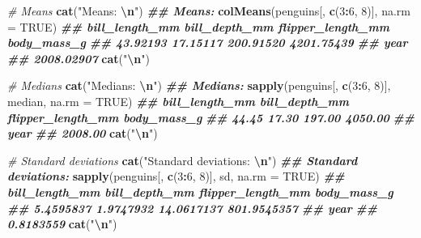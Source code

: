 \documentclass[
]{article}
\newenvironment{Shaded}{\begin{snugshade}}{\end{snugshade}}
\newcommand{\AttributeTok}[1]{\textcolor[rgb]{0.13,0.29,0.53}{#1}}
\newcommand{\CommentTok}[1]{\textcolor[rgb]{0.56,0.35,0.01}{\textit{#1}}}
\newcommand{\ConstantTok}[1]{\textcolor[rgb]{0.56,0.35,0.01}{#1}}
\newcommand{\DecValTok}[1]{\textcolor[rgb]{0.00,0.00,0.81}{#1}}
\newcommand{\DocumentationTok}[1]{\textcolor[rgb]{0.56,0.35,0.01}{\textbf{\textit{#1}}}}
\newcommand{\FunctionTok}[1]{\textcolor[rgb]{0.13,0.29,0.53}{\textbf{#1}}}
\newcommand{\NormalTok}[1]{#1}
\newcommand{\SpecialCharTok}[1]{\textcolor[rgb]{0.81,0.36,0.00}{\textbf{#1}}}
\newcommand{\StringTok}[1]{\textcolor[rgb]{0.31,0.60,0.02}{#1}}
\begin{document}
\begin{Shaded}
\begin{Highlighting}[]
\CommentTok{\# Means}
\FunctionTok{cat}\NormalTok{(}\StringTok{"Means: }\SpecialCharTok{\textbackslash{}n}\StringTok{"}\NormalTok{)}
\DocumentationTok{\#\# Means:}
\FunctionTok{colMeans}\NormalTok{(penguins[, }\FunctionTok{c}\NormalTok{(}\DecValTok{3}\SpecialCharTok{:}\DecValTok{6}\NormalTok{, }\DecValTok{8}\NormalTok{)], }\AttributeTok{na.rm =} \ConstantTok{TRUE}\NormalTok{)}
\DocumentationTok{\#\#    bill\_length\_mm     bill\_depth\_mm flipper\_length\_mm       body\_mass\_g }
\DocumentationTok{\#\#          43.92193          17.15117         200.91520        4201.75439 }
\DocumentationTok{\#\#              year }
\DocumentationTok{\#\#        2008.02907}
\FunctionTok{cat}\NormalTok{(}\StringTok{"}\SpecialCharTok{\textbackslash{}n}\StringTok{"}\NormalTok{)}

\CommentTok{\# Medians}
\FunctionTok{cat}\NormalTok{(}\StringTok{"Medians: }\SpecialCharTok{\textbackslash{}n}\StringTok{"}\NormalTok{)}
\DocumentationTok{\#\# Medians:}
\FunctionTok{sapply}\NormalTok{(penguins[, }\FunctionTok{c}\NormalTok{(}\DecValTok{3}\SpecialCharTok{:}\DecValTok{6}\NormalTok{, }\DecValTok{8}\NormalTok{)], median, }\AttributeTok{na.rm =} \ConstantTok{TRUE}\NormalTok{)}
\DocumentationTok{\#\#    bill\_length\_mm     bill\_depth\_mm flipper\_length\_mm       body\_mass\_g }
\DocumentationTok{\#\#             44.45             17.30            197.00           4050.00 }
\DocumentationTok{\#\#              year }
\DocumentationTok{\#\#           2008.00}
\FunctionTok{cat}\NormalTok{(}\StringTok{"}\SpecialCharTok{\textbackslash{}n}\StringTok{"}\NormalTok{)}

\CommentTok{\# Standard deviations}
\FunctionTok{cat}\NormalTok{(}\StringTok{"Standard deviations: }\SpecialCharTok{\textbackslash{}n}\StringTok{"}\NormalTok{)}
\DocumentationTok{\#\# Standard deviations:}
\FunctionTok{sapply}\NormalTok{(penguins[, }\FunctionTok{c}\NormalTok{(}\DecValTok{3}\SpecialCharTok{:}\DecValTok{6}\NormalTok{, }\DecValTok{8}\NormalTok{)], sd, }\AttributeTok{na.rm =} \ConstantTok{TRUE}\NormalTok{)}
\DocumentationTok{\#\#    bill\_length\_mm     bill\_depth\_mm flipper\_length\_mm       body\_mass\_g }
\DocumentationTok{\#\#         5.4595837         1.9747932        14.0617137       801.9545357 }
\DocumentationTok{\#\#              year }
\DocumentationTok{\#\#         0.8183559}
\FunctionTok{cat}\NormalTok{(}\StringTok{"}\SpecialCharTok{\textbackslash{}n}\StringTok{"}\NormalTok{)}
\end{Highlighting}
\end{Shaded}
\end{document}
